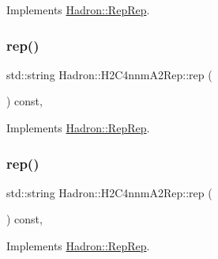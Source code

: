 Implements \mbox{\hyperlink{structHadron_1_1RepRep_ab3213025f6de249f7095892109575fde}{Hadron\+::\+Rep\+Rep}}.

\mbox{\label{structHadron_1_1H2C4nnmA2Rep_ab3b885d6ae0238dfffab82f55bbf4a2d}} 
\subsubsection{\texorpdfstring{rep()}{rep()}\hspace{0.1cm}{\footnotesize\ttfamily [2/5]}}
{\footnotesize\ttfamily std\+::string Hadron\+::\+H2\+C4nnm\+A2\+Rep\+::rep (\begin{DoxyParamCaption}{ }\end{DoxyParamCaption}) const\hspace{0.3cm}{\ttfamily [inline]}, {\ttfamily [virtual]}}



Implements \mbox{\hyperlink{structHadron_1_1RepRep_ab3213025f6de249f7095892109575fde}{Hadron\+::\+Rep\+Rep}}.

\mbox{\label{structHadron_1_1H2C4nnmA2Rep_ab3b885d6ae0238dfffab82f55bbf4a2d}} 
\subsubsection{\texorpdfstring{rep()}{rep()}\hspace{0.1cm}{\footnotesize\ttfamily [3/5]}}
{\footnotesize\ttfamily std\+::string Hadron\+::\+H2\+C4nnm\+A2\+Rep\+::rep (\begin{DoxyParamCaption}{ }\end{DoxyParamCaption}) const\hspace{0.3cm}{\ttfamily [inline]}, {\ttfamily [virtual]}}



Implements \mbox{\hyperlink{structHadron_1_1RepRep_ab3213025f6de249f7095892109575fde}{Hadron\+::\+Rep\+Rep}}.

\mbox{\label{structHadron_1_1H2C4nnmA2Rep_ab3b885d6ae0238dfffab82f55bbf4a2d}} 
